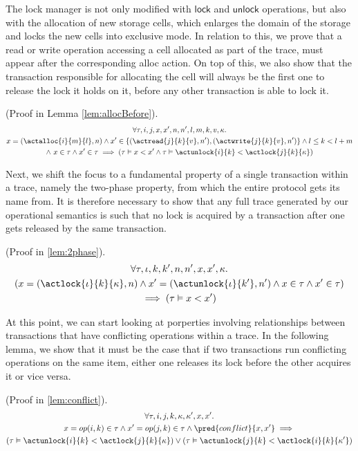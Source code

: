 The lock manager is not only modified with $\mathsf{lock}$ and $\mathsf{unlock}$ operations, but also with the allocation of new storage cells, which enlarges the domain of the storage and locks the new cells into exclusive mode. In relation to this, we prove that a read or write operation accessing a cell allocated as part of the trace, must appear after the corresponding alloc action. On top of this, we also show that the transaction responsible for allocating the cell will always be the first one to release the lock it holds on it, before any other transaction is able to lock it.
\begin{lem}
	\label{prop:allocBefore}
	(Proof in Lemma \ref{lem:allocBefore}).
	\begin{gather*}
		\forall \tau, i, j, x, x', n, n', l, m, k, v, \kappa \ldotp \\
		x = (\actalloc{i}{m}{l}, n) \land x' \in \{ (\actread{j}{k}{v}, n'), (\actwrite{j}{k}{v}, n') \} \land l \leq k < l + m
		\\
		\land\ x \in \tau \land x' \in \tau
		\implies
		\left( \tau \vDash x < x'  \land \tau \vDash \actunlock{i}{k} < \actlock{j}{k}{\kappa} \right)
	\end{gather*}
\end{lem}

Next, we shift the focus to a fundamental property of a single transaction within a trace, namely the two-phase property, from which the entire protocol gets its name from. It is therefore necessary to show that any full trace generated by our operational semantics is such that no lock is acquired by a transaction after one gets released by the same transaction.
\begin{lem}
	\label{prop:2phase}
	(Proof in \ref{lem:2phase}).
	\begin{gather*}
		\forall \tau, \iota, k, k', n, n', x, x', \kappa \ldotp \\
		\left( x = (\actlock{\iota}{k}{\kappa}, n) \land x' = (\actunlock{\iota}{k'}, n') \land x \in \tau \land x' 	\in \tau \right) \\
		\implies \left( \tau \vDash x < x' \right)
	\end{gather*}
\end{lem}

At this point, we can start looking at porperties involving relationships between transactions that have conflicting operations within a trace. In the following lemma, we show that it must be the case that if two transactions run conflicting operations on the same item, either one releases its lock before the other acquires it or vice versa.
\begin{lem}
	\label{prop:conflict}
	(Proof in \ref{lem:conflict}).
	\begin{gather*}
		\forall \tau, i, j, k, \kappa, \kappa', x, x' \ldotp \\
		x = op(i, k) \in \tau \land x' = op(j, k) \in \tau \land \pred{conflict}{x, x'} \implies \\
		\left( \tau \vDash \actunlock{i}{k} < \actlock{j}{k}{\kappa} \right) \lor \left( \tau \vDash \actunlock{j}{k} < \actlock{i}{k}{\kappa'} \right)
	\end{gather*}
\end{lem}

